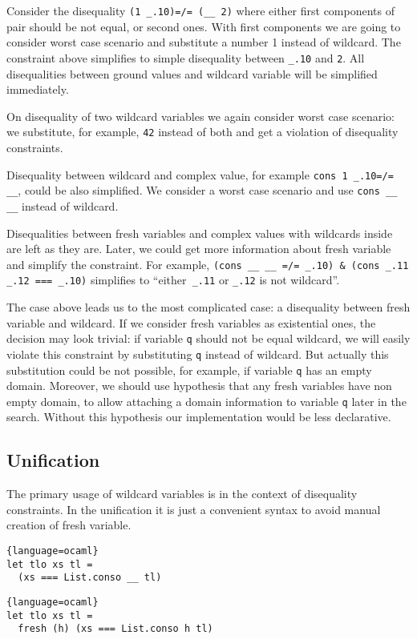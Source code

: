 Consider the disequality \lstinline|(1 _.10)=/= (__ 2)| where either first components of pair should be not equal, or second ones. With first components we are going to consider worst case scenario and substitute a number 1 instead of wildcard. The constraint above simplifies to simple disequality between  \lstinline|_.10| and \lstinline|2|. All disequalities between ground values and wildcard variable will be simplified immediately.

On disequality of two wildcard variables we again consider worst case scenario: we substitute, for example, \lstinline|42| instead of both and get a violation of disequality constraints.

Disequality between wildcard and complex value, for example  \lstinline|cons 1 _.10=/= __|, could be also simplified. We consider a worst case scenario and use \lstinline|cons __ __| instead of wildcard.

Disequalities between fresh variables and complex values with wildcards inside are left as they are. Later, we could get more information  about fresh variable and simplify the constraint. For example, 
 \lstinline|(cons __ __ =/= _.10) & (cons _.11 _.12 === _.10)| simplifies to ``either\lstinline| _.11|  or \lstinline|_.12| is not wildcard''.

The case above leads us to the most complicated case: a disequality between fresh variable and wildcard. If we consider fresh variables as existential ones, the decision may look trivial: if variable \lstinline|q| should not be equal wildcard, we will easily violate this constraint by substituting \lstinline|q| instead of wildcard. But actually this substitution could be not possible, for example, if variable \lstinline|q| has an empty domain. Moreover, we should use hypothesis that any fresh variables have non empty domain, to allow attaching a domain information to variable \lstinline|q| later in the search. Without this hypothesis our \miniKanren{} implementation would be less declarative.



\subsection{Unification}
The primary usage of wildcard variables is in the context of disequality constraints. In the unification it is just a convenient syntax to avoid manual creation of fresh variable. 

\begin{minipage}{7cm}
\begin{lstlisting}{language=ocaml}
let tlo xs tl = 
  (xs === List.conso __ tl)
\end{lstlisting}
\end{minipage}
\begin{minipage}{9.5cm}
\begin{lstlisting}{language=ocaml}
let tlo xs tl = 
  fresh (h) (xs === List.conso h tl)
\end{lstlisting}
\end{minipage}
